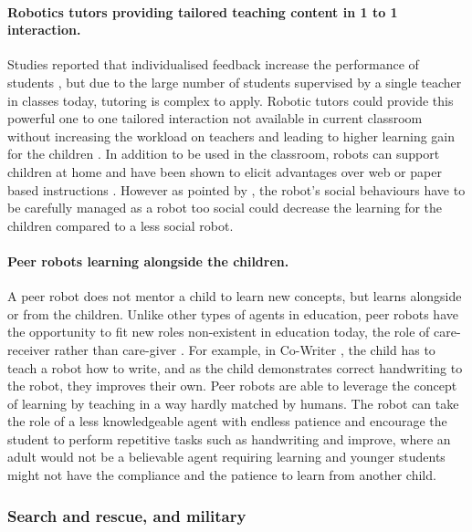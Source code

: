 	\paragraph{Robotics tutors providing tailored teaching content in 1 to 1 interaction.} 
	Studies reported that individualised feedback increase the performance of students \citep{cohen1982educational,bloom19842}, but due to the large number of students supervised by a single teacher in classes today, tutoring is complex to apply. Robotic tutors could provide this powerful one to one tailored interaction not available in current classroom without increasing the workload on teachers and leading to higher learning gain for the children \citep{kanda2004interactive,leyzberg2012physical,kennedy2016social,gordon2016affective}. In addition to be used in the classroom, robots can support children at home and have been shown to elicit advantages over web or paper based instructions \citep{han2005educational}. However as pointed by \citet{kennedy2015robot}, the robot's social behaviours have to be carefully managed as a robot too social could decrease the learning for the children compared to a less social robot. 
	
	\paragraph{Peer robots learning alongside the children.}
	A peer robot does not mentor a child to learn new concepts, but learns alongside or from the children. Unlike other types of agents in education, peer robots have the opportunity to fit new roles non-existent in education today, the role of care-receiver rather than care-giver \cite{tanaka2012children}. For example, in Co-Writer \citep{hood2015children}, the child has to teach a robot how to write, and as the child demonstrates correct handwriting to the robot, they improves their own. Peer robots are able to leverage the concept of learning by teaching \citep{frager1970learning} in a way hardly matched by humans. The robot can take the role of a less knowledgeable agent with endless patience and encourage the student to perform repetitive tasks such as handwriting and improve, where an adult would not be a believable agent requiring learning and younger students might not have the compliance and the patience to learn from another child.
	
\subsubsection{Search and rescue, and military} 
	
